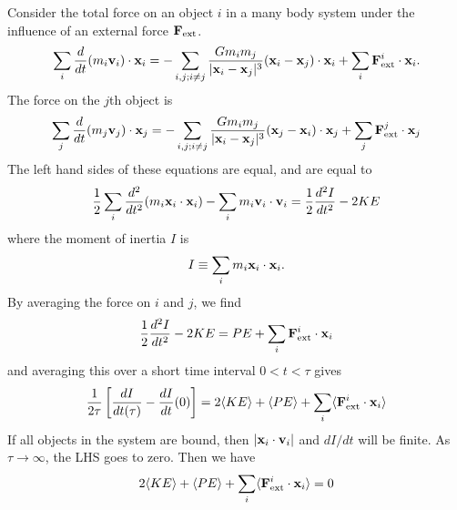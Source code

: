 \documentclass[]{article}
\begin{document}
Consider the total force on an object $i$ in 
a many body system under the influence of an external force $\mathbf{F}_{\mathrm{ext}}$.
\begin{equation}
\sum_i \frac{d}{dt} (m_i \mathbf{v}_i) \cdot \mathbf{x}_i = -\sum_{i,j; i\ne j} \frac{Gm_i m_j}{|\mathbf{x}_i - \mathbf{x}_j|^{3}} (\mathbf{x}_i - \mathbf{x}_j) \cdot \mathbf{x}_i + \sum_i \mathbf{F}_{\mathrm{ext}}^{i} \cdot \mathbf{x}_i.
\end{equation}
\noindent
The force on the $j$th object is
\begin{equation}
\sum_j \frac{d}{dt} (m_j \mathbf{v}_j) \cdot \mathbf{x}_j = - \sum_{i,j;i\ne j }\frac{G m_i m_j}{|\mathbf{x}_i - \mathbf{x}_j|^{3}}(\mathbf{x}_j - \mathbf{x}_i)\cdot\mathbf{x}_j + \sum_j \mathbf{F}_{\mathrm{ext}}^{j} \cdot \mathbf{x}_j
\end{equation}
\noindent
The left hand sides of these equations are equal, and are equal to
\begin{equation}
\frac{1}{2} \sum_i \frac{d^2}{dt^2}(m_i\mathbf{x}_i \cdot \mathbf{x}_i) - \sum_i m_i \mathbf{v}_i \cdot \mathbf{v}_i = \frac{1}{2} \frac{d^2I}{dt^2} -2 KE
\end{equation}
\noindent
where the moment of inertia $I$ is
\begin{equation}
I \equiv \sum_i m_i \mathbf{x}_i \cdot \mathbf{x}_i.
\end{equation}
\noindent
By averaging the force on $i$ and $j$, we find
\begin{equation}
\frac{1}{2} \frac{d^2 I}{dt^2} - 2 KE = PE + \sum_i \mathbf{F}_{\mathrm{ext}}^{i} \cdot \mathbf{x}_i
\end{equation}
\noindent
and averaging this over a short time interval $0<t<\tau$ gives
\begin{equation}
\frac{1}{2\tau}\left[ \frac{dI}{dt(\tau)} - \frac{dI}{dt}(0)\right] = 2 \langle KE\rangle + \langle PE\rangle + \sum_i \langle\mathbf{F}_{\mathrm{ext}}^{i} \cdot \mathbf{x}_i\rangle
\end{equation}
\noindent
If all objects in the system are bound, then $|\mathbf{x}_i \cdot \mathbf{v}_i|$ and $dI/dt$ will be finite.  As $\tau\to\infty$, the LHS goes to zero.  Then we have
\begin{equation}
2\langle KE\rangle + \langle PE\rangle + \sum_i \langle\mathbf{F}_{\mathrm{ext}}^{i} \cdot \mathbf{x}_i\rangle = 0
\end{equation}
\end{document}
